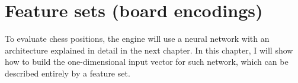 \newcommand{\white}{\fullmoon}
\newcommand{\black}{\newmoon}

\newcommand{\bigtimes}{\mathop{\raisebox{-0.5ex}{\scalebox{2}{$\times$}}}}

\newcommand{\pieceBoard}{
    \newcount\pieceindex
    \setcounter{pieceindex}{0}
    \raisebox{-7ex}{
        \centering
        \chessboard[
            tinyboard,
            showmover=false,
            margin=false,
            padding=false,
            hlabel=false,
            vlabel=false,
            pgfstyle={text},
            text=\fontsize{1.2ex}{1.2ex}\bfseries\sffamily \currentwq,
            markboard
        ]
    }
}
\newcommand{\pieceRolesTable}{
    \begin{tabular}{|l|}
        \hline
        \sympawn\ Pawn \\
        \hline
        \symknight\ Knight \\
        \hline
        \symbishop\ Bishop \\
        \hline
        \symrook\ Rook \\
        \hline
        \symqueen\ Queen \\
        \hline
        \symking\ King \\
        \hline
    \end{tabular}
}
\newcommand{\pieceColorsTable}{
    \begin{tabular}{|l|}
        \hline
        $\white$ White \\
        \hline
        $\black$ Black \\
        \hline
    \end{tabular}
}

\newcommand{\featureset}[1]{\textsc{#1}}
\newcommand{\feature}[1]{$\langle$#1$\rangle$}


\section{Feature sets (board encodings)}

To evaluate chess positions, the engine will use a neural network with an architecture explained in detail in the next chapter. In this chapter, I will show how to build the one-dimensional input vector for such network, which can be described entirely by a feature set. \\

